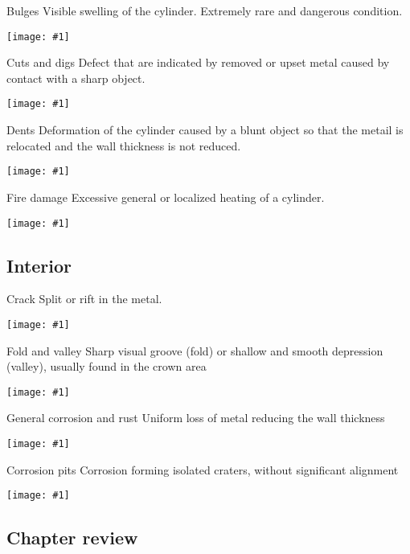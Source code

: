 \documentclass[aspectratio=1610,english,12pt]{beamer}
\newcommand{\vipict}[1]{%
	\hfill
	\begin{center}
		\texttt{[image: \#1]}
	\end{center}
	\hfill 
}
\begin{document}
\begin{frame}{Bulges}
	Visible swelling of the cylinder. Extremely rare and dangerous condition.
	\vipict{../img/buldge}
\end{frame}

\begin{frame}{Cuts and digs}
	Defect that are indicated by removed or upset metal caused by contact with a sharp object.
	\vipict{../img/cut}
\end{frame}

\begin{frame}{Dents}
	Deformation of the cylinder caused by a blunt object so that the metail is relocated and the wall thickness is not reduced.
	\vipict{../img/dent}
\end{frame}

\begin{frame}{Fire damage}
	Excessive general or localized heating of a cylinder.
	\vipict{../img/fire}
\end{frame}

\subsection{Interior}
\begin{frame}{Crack}
	Split or rift in the metal.
	\vipict{../img/crack}
\end{frame}

\begin{frame}{Fold and valley}  
	Sharp visual groove (fold) or shallow and smooth depression (valley), usually found in the crown area
	\vipict{../img/fold}
\end{frame}

\begin{frame}{General corrosion and rust}  
	Uniform loss of metal reducing the wall thickness
	\vipict{../img/corrosion}
\end{frame}

\begin{frame}{Corrosion pits}  
	Corrosion forming isolated craters, without significant alignment
	\vipict{../img/pit}
\end{frame}

\subsection{Chapter review}
\end{document}
